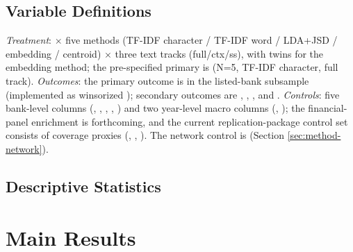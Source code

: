 \subsection{Variable Definitions}
\emph{Treatment}: 
$\times$ five methods (TF-IDF character / TF-IDF word / LDA+JSD /
embedding / centroid) $\times$ three text tracks (full/ctx/ss), with
 twins for the embedding method; the pre-specified primary
is  (N=5, TF-IDF character, full track).
\emph{Outcomes}: the primary outcome is  in the
listed-bank subsample (implemented as winsorized );
secondary outcomes are , ,
, and .
\emph{Controls}: five bank-level columns (,
, , ,
) and two year-level macro columns
(, ); the financial-panel
enrichment is forthcoming, and the current replication-package
control set consists of coverage proxies (,
, ). The network control is
 (Section \ref{sec:method-network}).

\subsection{Descriptive Statistics}

\section{Main Results}\label{sec:main}

